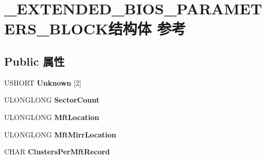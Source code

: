 \hypertarget{struct___e_x_t_e_n_d_e_d___b_i_o_s___p_a_r_a_m_e_t_e_r_s___b_l_o_c_k}{}\section{\+\_\+\+E\+X\+T\+E\+N\+D\+E\+D\+\_\+\+B\+I\+O\+S\+\_\+\+P\+A\+R\+A\+M\+E\+T\+E\+R\+S\+\_\+\+B\+L\+O\+C\+K结构体 参考}
\label{struct___e_x_t_e_n_d_e_d___b_i_o_s___p_a_r_a_m_e_t_e_r_s___b_l_o_c_k}
\subsection*{Public 属性}
\begin{DoxyCompactItemize}
\item 
\mbox{\label{struct___e_x_t_e_n_d_e_d___b_i_o_s___p_a_r_a_m_e_t_e_r_s___b_l_o_c_k_ac301055249cb511b6717f568b3a358bd}} 
U\+S\+H\+O\+RT {\bfseries Unknown} \mbox{[}2\mbox{]}
\item 
\mbox{\label{struct___e_x_t_e_n_d_e_d___b_i_o_s___p_a_r_a_m_e_t_e_r_s___b_l_o_c_k_a9393420aeac84609bb4a029253f8c58e}} 
U\+L\+O\+N\+G\+L\+O\+NG {\bfseries Sector\+Count}
\item 
\mbox{\label{struct___e_x_t_e_n_d_e_d___b_i_o_s___p_a_r_a_m_e_t_e_r_s___b_l_o_c_k_abe5e5483de2f27b27a3217fa957baf85}} 
U\+L\+O\+N\+G\+L\+O\+NG {\bfseries Mft\+Location}
\item 
\mbox{\label{struct___e_x_t_e_n_d_e_d___b_i_o_s___p_a_r_a_m_e_t_e_r_s___b_l_o_c_k_a5a20f44b75b87a56652a61f96c6e21e4}} 
U\+L\+O\+N\+G\+L\+O\+NG {\bfseries Mft\+Mirr\+Location}
\item 
\mbox{\label{struct___e_x_t_e_n_d_e_d___b_i_o_s___p_a_r_a_m_e_t_e_r_s___b_l_o_c_k_a685871ec9ae30ad05351ab467657fcf7}} 
C\+H\+AR {\bfseries Clusters\+Per\+Mft\+Record}
\item 

\end{DoxyCompactItemize}
